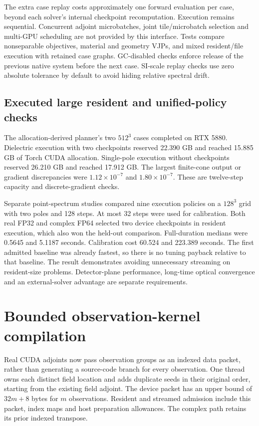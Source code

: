 \documentclass[11pt,a4paper]{article}
\begin{document}
The extra case replay costs approximately one forward evaluation per case,
beyond each solver's internal checkpoint recomputation. Execution remains
sequential. Concurrent adjoint microbatches, joint tile/microbatch selection
and multi-GPU scheduling are not provided by this interface. Tests compare
nonseparable objectives, material and geometry VJPs, and mixed resident/file
execution with retained case graphs. GC-disabled checks enforce release of
the previous native system before the next case. SI-scale replay checks use
zero absolute tolerance by default to avoid hiding relative spectral drift.

\subsection{Executed large resident and unified-policy checks}
The allocation-derived planner's two $512^3$ cases completed on RTX 5880.
Dielectric execution with two checkpoints reserved 22.390 GB and reached
15.885 GB of Torch CUDA allocation. Single-pole execution without checkpoints
reserved 26.210 GB and reached 17.912 GB. The largest finite-cone output or
gradient discrepancies were $1.12\times10^{-7}$ and $1.80\times10^{-7}$.
These are twelve-step capacity and discrete-gradient checks.

Separate point-spectrum studies compared nine execution policies on a
$128^3$ grid with two poles and 128 steps. At most 32 steps were used for calibration.
Both real FP32 and complex FP64 selected two device checkpoints in resident
execution, which also won the held-out comparison. Full-duration medians were
0.5645 and 5.1187 seconds. Calibration cost 60.524 and 223.389 seconds.
The first admitted baseline was already fastest, so there is no tuning
payback relative to that baseline. The result demonstrates avoiding
unnecessary streaming on resident-size problems. Detector-plane performance,
long-time optical convergence and an external-solver advantage are separate
requirements.


\section{Bounded observation-kernel compilation}
Real CUDA adjoints now pass observation groups as an indexed data packet,
rather than generating a source-code branch for every observation. One thread
owns each distinct field location and adds duplicate seeds in their original
order, starting from the existing field adjoint. The device packet has an
upper bound of $32m+8$ bytes for $m$ observations. Resident and streamed
admission include this packet, index maps and host preparation allowances.
The complex path retains its prior indexed transpose.
\end{document}
